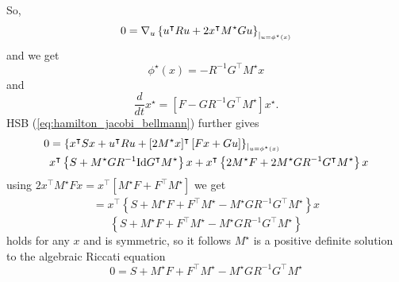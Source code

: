 So, 
\begin{align*}
    0=\nabla_u\left\{u^\intercal R u+2 x^\intercal M^\star Gu \right\}_{|_{u=\phi^\star(x)}}
\end{align*}
and we get 
\[\phi^\star(x)=-R^{-1}G^\intercal M^\star x\]
and 
\[\frac{d}{dt}x^\star=\left[F-GR^{-1}G^\intercal M^\star\right]x^\star.\]
HSB (\ref{eq:hamilton_jacobi_bellmann}) further gives 
\begin{align*}
    0&=\{x^\intercal S x+ u^\intercal R u+[2M^\star x]^\intercal \left[Fx+Gu\right]\}_{|_{u=\phi^\star(x)}}\\
    &x^\intercal \left\{S+M^\star GR^{-1}\text{Id} G^\intercal M^\star \right\}x+x^\intercal\left\{2M^\star F+2M^\star G R^{-1}G^\intercal M^\star \right\}x
\end{align*}
using \(2x^\intercal M^\star Fx=x^\intercal \left[M^\star F + F^\intercal M^\star\right]\)
we get 
\begin{align*}
    =x^\intercal \left\{S+M^\star F+ F^\intercal M^\star-M^\star GR^{-1}G^\intercal M^\star\right\}x %
\end{align*}
\[\left\{S+M^\star F+ F^\intercal M^\star-M^\star GR^{-1}G^\intercal M^\star\right\}\]
holds for any \(x\) and is symmetric, so it follows \(M^\star\) is a positive definite solution to the 
algebraic Riccati equation 
\[0=S+M^\star F+ F^\intercal M^\star- M^\star GR^{-1}G^\intercal M^\star\]
